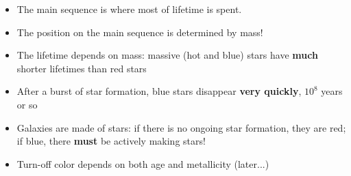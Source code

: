 \documentclass[letterpaper,landscape]{slides}
\begin{document}
\begin{slide}
{\begin{minipage}[t]{12cm}
\begin{itemize}
\item {\color{blue} The main sequence} is where most of lifetime is spent.
\item {\color{blue} The position on the main sequence} is determined by mass! 
\item {\color{blue} The lifetime depends on mass:} massive (hot and blue) stars
                    have {\bf much} shorter lifetimes than red stars
\item {\color{blue} After a burst of star formation,} blue stars disappear 
                    {\bf very quickly}, $10^8$ years or so
\item {\color{blue} Galaxies are made of stars:} if there is no ongoing 
         star formation, they are red; if blue, there {\bf must} be actively
         making stars!
\item Turn-off color depends on both age and metallicity (later...) 
\end{itemize}

\end{minipage}}
\vfill 
\end{slide}
\end{document}
